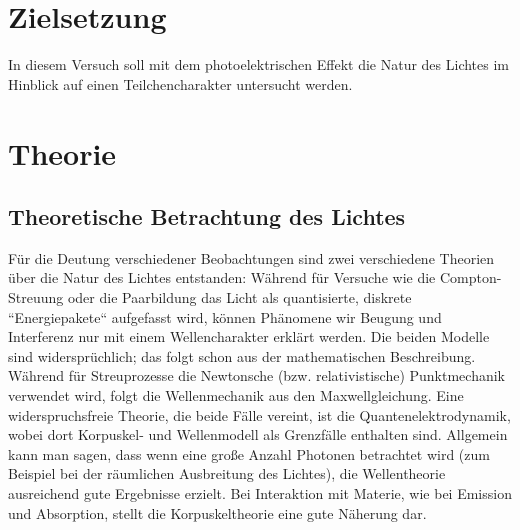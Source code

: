 \section*{Zielsetzung}
\label{sec:Zielsetzung}
In diesem Versuch soll mit dem photoelektrischen Effekt die Natur des Lichtes im Hinblick
auf einen Teilchencharakter untersucht werden.

\section{Theorie}
\label{sec:Theorie}

\subsection{Theoretische Betrachtung des Lichtes}
\label{sec:Theoretische Betrachtung des Lichtes}
Für die Deutung verschiedener Beobachtungen sind zwei verschiedene Theorien über die Natur
des Lichtes entstanden: Während für Versuche wie die Compton-Streuung oder die Paarbildung
das Licht als quantisierte, diskrete ``Energiepakete`` aufgefasst wird, können Phänomene
wir Beugung und Interferenz nur mit einem Wellencharakter erklärt werden.
Die beiden Modelle sind widersprüchlich; das folgt schon aus der mathematischen
Beschreibung. Während für Streuprozesse die Newtonsche (bzw. relativistische) Punktmechanik
verwendet wird, folgt die Wellenmechanik aus den Maxwellgleichung.
Eine widerspruchsfreie Theorie, die beide Fälle vereint, ist die Quantenelektrodynamik,
wobei dort Korpuskel- und Wellenmodell als Grenzfälle enthalten sind. Allgemein kann man
sagen, dass wenn eine große Anzahl Photonen betrachtet wird (zum Beispiel bei der
räumlichen Ausbreitung des Lichtes), die Wellentheorie ausreichend gute Ergebnisse
erzielt. Bei Interaktion mit Materie, wie bei Emission und Absorption, stellt die
Korpuskeltheorie eine gute Näherung dar. 

